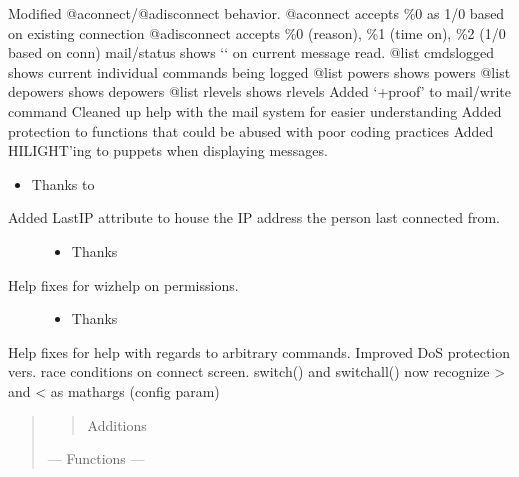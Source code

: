 \documentclass[letterpaper,10pt,english]{sphinxmanual}
\begin{document}
\sphinxAtStartPar
Modified @aconnect/@adisconnect behavior.
@aconnect accepts \%0 as 1/0 based on existing connection
@adisconnect accepts \%0 (reason), \%1 (time on), \%2 (1/0 based on conn)
mail/status shows ‘\sphinxhyphen{}‘ on current message read.
@list cmdslogged \sphinxhyphen{} shows current individual commands being logged
@list powers \sphinxhyphen{} shows powers
@list depowers \sphinxhyphen{} shows depowers
@list rlevels \sphinxhyphen{} shows rlevels
Added ‘+proof’ to mail/write command
Cleaned up help with the mail system for easier understanding
Added protection to functions that could be abused with poor coding practices
Added HILIGHT’ing to puppets when displaying messages.
\begin{itemize}
\item {} 
\sphinxAtStartPar
Thanks to 

\end{itemize}
\begin{description}
\item[{Added LastIP attribute to house the IP address the person last connected from.}] \leavevmode\begin{itemize}
\item {} 
\sphinxAtStartPar
Thanks 

\end{itemize}

\item[{Help fixes for wizhelp on permissions.}] \leavevmode\begin{itemize}
\item {} 
\sphinxAtStartPar
Thanks 

\end{itemize}

\end{description}

\sphinxAtStartPar
Help fixes for help with regards to arbitrary commands.
Improved DoS protection vers. race conditions on connect screen.
switch() and switchall() now recognize \textgreater{} and \textless{} as math\sphinxhyphen{}args (config param)
\begin{quote}
\begin{quote}

\sphinxAtStartPar
Additions
\end{quote}

\sphinxAtStartPar
— Functions —
\end{quote}
\end{document}
